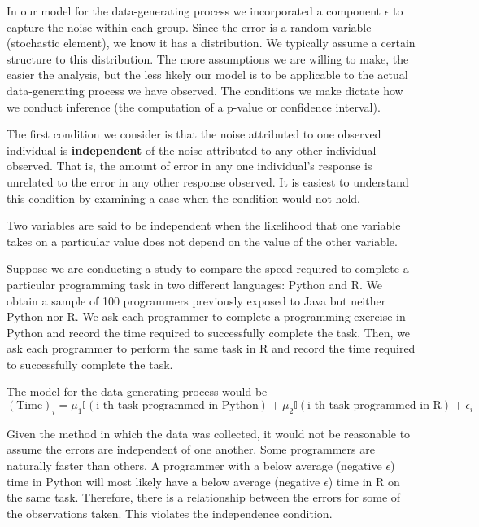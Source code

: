 \documentclass[]{book}
\theoremstyle{definition}
\theoremstyle{definition}
\theoremstyle{definition}
\theoremstyle{remark}
\let\BeginKnitrBlock\begin \let\EndKnitrBlock\end
\begin{document}
In our model for the data-generating process we incorporated a component
\(\epsilon\) to capture the noise within each group. Since the error is
a random variable (stochastic element), we know it has a distribution.
We typically assume a certain structure to this distribution. The more
assumptions we are willing to make, the easier the analysis, but the
less likely our model is to be applicable to the actual data-generating
process we have observed. The conditions we make dictate how we conduct
inference (the computation of a p-value or confidence interval).

The first condition we consider is that the noise attributed to one
observed individual is \textbf{independent} of the noise attributed to
any other individual observed. That is, the amount of error in any one
individual's response is unrelated to the error in any other response
observed. It is easiest to understand this condition by examining a case
when the condition would not hold.

\BeginKnitrBlock{definition}[Independence]
\protect\hypertarget{def:defn-independence}{}{\label{def:defn-independence}
{} }Two variables are said to be independent
when the likelihood that one variable takes on a particular value does
not depend on the value of the other variable.
\EndKnitrBlock{definition}

\BeginKnitrBlock{example}[Programming Speed]
\protect\hypertarget{exm:ex-programming}{}{\label{exm:ex-programming}
{} }Suppose we are conducting a study to
compare the speed required to complete a particular programming task in
two different languages: Python and R. We obtain a sample of 100
programmers previously exposed to Java but neither Python nor R. We ask
each programmer to complete a programming exercise in Python and record
the time required to successfully complete the task. Then, we ask each
programmer to perform the same task in R and record the time required to
successfully complete the task.

The model for the data generating process would be \[
(\text{Time})_i = \mu_1 \mathbb{I}(\text{i-th task programmed in Python}) + \mu_2 \mathbb{I}(\text{i-th task programmed in R}) + \epsilon_i
\]

Given the method in which the data was collected, it would not be
reasonable to assume the errors are independent of one another. Some
programmers are naturally faster than others. A programmer with a below
average (negative \(\epsilon\)) time in Python will most likely have a
below average (negative \(\epsilon\)) time in R on the same task.
Therefore, there is a relationship between the errors for some of the
observations taken. This violates the independence condition.
\EndKnitrBlock{example}
\end{document}
